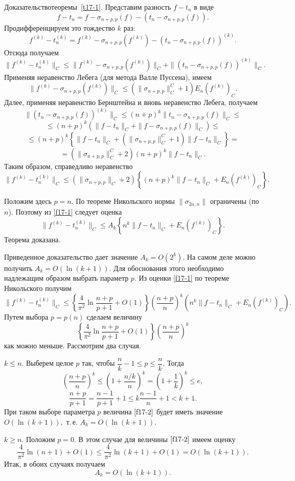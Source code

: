  Д\;о\;к\;а\;з\;а\;т\;е\;л\;ь\;с\;т\;в\;о\quad теоремы~\ref{t17-1}.
 Представим разность $f-t_n$ в виде
 $$
 f-t_n=f-\sigma_{n+p,p}(f)-(t_n-\sigma_{n+p,p}(f)).
 $$
 Продифференцируем это тождество $k$ раз:
 $$
 f^{(k)}-t_n^{(k)}=f^{(k)}-\sigma_{n+p,p}(f^{(k)})-(t_n-
 \sigma_{n+p,p}(f))^{(k)}.
 $$
Отсюда получаем
 $$
 \|f^{(k)}-t_n^{(k)}\|_C\le \|f^{(k)}-\sigma_{n+p,p}(f^{(k)})\|_C+\|(t_n-
 \sigma_{n+p,p}(f))^{(k)}\|_C.
 $$
 Применяя неравенство Лебега  (для метода Валле Пуссена), имеем
 $$
 \|f^{(k)}-\sigma_{n+p,p}(f^{(k)})\|_C\le
 ({\|\sigma_{n+p,p}\|_C^C}+1) E_n(f^{(k)})_C.
 $$
 Далее, применяя неравенство Бернштейна и вновь неравенство  Лебега, получаем
 $$
 \|(t_n-
 \sigma_{n+p,p}(f))^{(k)}\|_C\le (n+p)^k \|t_n-
 \sigma_{n+p,p}(f)\|_C\le
 $$
 $$
 \le
  (n+p)^k (\|f-t_n\|_C+\|f-
 \sigma_{n+p,p}(f)\|_C)
 \le
 $$
 $$
 \le (n+p)^k \left\{
 \|f-t_n\|_C+({\|\sigma_{n+p,p}\|_C^C}+1)\|f-t_n\|_C\right\} =
 $$
 $$
 =({\|\sigma_{n+p,p}\|_C^C}+2)  (n+p)^k
 \|f-t_n\|_C.
 $$
 Таким образом,  справедливо неравенство
 \begin{equation}\label{f17-1}
 \|f^{(k)}-t_n^{(k)}\|_C\le (\|\sigma_{n+p,p}\|_C+2) \left\{ (n+p)^k
 \|f-t_n\|_C+E_n(f^{(k)})_C\right\}. %
 \end{equation}

 Положим здесь $p=n.$ По  теореме Никольского нормы $\|\sigma_{2n,n}\|$
 ограничены (по $n$). Поэтому  из {\eqref{f17-1}} следует оценка
 $$
 \|f^{(k)}-t_n^{(k)}\|_C\le A_k \left\{ n^k \|f-t_n\|_C+E_n
 (f^{(k)})_{{C}}\right\}.
 $$
 Теорема доказана.

 \begin{Remark} %
 Приведенное  доказательство дает значение $A_k=O(2^k).$ На самом деле можно получить   $A_k=O(\ln(k+1)).$
 Для обоснования этого необходимо   надлежащим образом выбрать
 параметр $p.$ Из оценки {\eqref{f17-1}}  по теореме
 Никольского получим
 $$
 \|f^{(k)}-t_n^{(k)}\|_C\le \left\{ \frac{4}{\pi^2}\ln
 \frac{n+p}{p+1}+O(1) \right\} \left( \frac{n+p}{n}\right)^k \left(
 n^k \|f-t_n\|_C+E_n (f^{(k)})_C\right).
 $$
 Путем выбора $p=p(n)$ сделаем величину
  \begin{equation}\label{f17-2}
\left\{ \frac{4}{\pi^2}\ln \frac{n+p}{p+1}+O(1)\right\} \left(
 \frac{n+p}{n}\right)^k %
  \end{equation}
 как можно меньше. Рассмотрим два случая.

 {\Case $k\le n.$} Выберем целое $p$ так, чтобы $\dfrac{n}{k}-1\le p\le \dfrac{n}{k}.$
 Тогда
 $$
 \left( \frac{n+p}{n}\right)^k \le \left( 1+
 \frac{{n}/{k}}{n}\right)^k = \left(
 1+\frac{1}{k}\right)^k\le e,
 $$
 $$
 \frac{n+p}{p+1}=\frac{n-1}{p+1}+1\le k\frac{n-1}{n}+1< k+1.
 $$
 При таком выборе параметра $p$ величина {$\eqref{f17-2}$}
 будет иметь значение   $O(\ln(k+1)),$ т.\,е. $A_k=O(\ln(k+1)).$

 {\Case $k\ge n.$}
 \noindent  Положим $p=0.$ В этом случае для величины {$\eqref{f17-2}$}  имеем {оценку}
 $$
 \frac{4}{\pi^2} \ln (n+1)+O(1)\le
 \frac{4}{\pi^2} \ln (k+1)+O(1)=O(\ln(k+1)).
 $$
 Итак, в обоих случаях получаем
 $$
 A_k=O(\ln(k+1)).
 $$
 \end{Remark}

